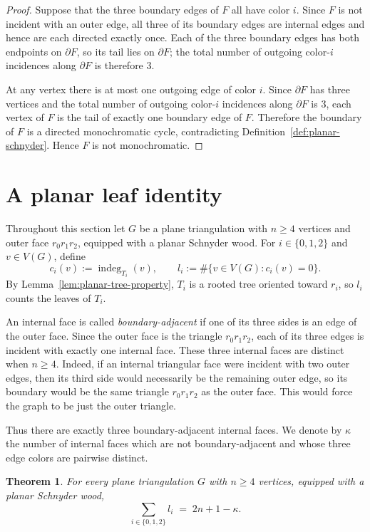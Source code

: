 \documentclass[11pt]{amsart}
\newcommand{\Zthree}{\{0,1,2\}}
\newcommand{\indeg}{\operatorname{indeg}}
\theoremstyle{plain}
\newtheorem{theorem}{Theorem}
\theoremstyle{definition}
\theoremstyle{remark}
\begin{document}
\begin{proof}
Suppose that the three boundary edges of $F$ all have color $i$. Since $F$ is not incident with an outer edge, all three of its boundary edges are internal edges and hence are each directed exactly once. Each of the three boundary edges has both endpoints on $\partial F$, so its tail lies on $\partial F$; the total number of outgoing color-$i$ incidences along $\partial F$ is therefore $3$.

At any vertex there is at most one outgoing edge of color $i$. Since $\partial F$ has three vertices and the total number of outgoing color-$i$ incidences along $\partial F$ is $3$, each vertex of $F$ is the tail of exactly one boundary edge of $F$. Therefore the boundary of $F$ is a directed monochromatic cycle, contradicting Definition~\ref{def:planar-schnyder}. Hence $F$ is not monochromatic.
\end{proof}


\section{A planar leaf identity}
\label{sec:planar-id}

Throughout this section let $G$ be a plane triangulation with $n \ge 4$ vertices and outer face $r_0 r_1 r_2$, equipped with a planar Schnyder wood. For $i \in \Zthree$ and $v \in V(G)$, define
\[
  c_i(v) := \indeg_{T_i}(v),
  \qquad
  l_i := \#\{v \in V(G) : c_i(v) = 0\}.
\]
By Lemma~\ref{lem:planar-tree-property}, $T_i$ is a rooted tree oriented toward $r_i$, so $l_i$ counts the leaves of $T_i$.

An internal face is called \emph{boundary-adjacent} if one of its three sides is an edge of the outer face. Since the outer face is the triangle $r_0 r_1 r_2$, each of its three edges is incident with exactly one internal face. These three internal faces are distinct when $n \ge 4$. Indeed, if an internal triangular face were incident with two outer edges, then its third side would necessarily be the remaining outer edge, so its boundary would be the same triangle $r_0 r_1 r_2$ as the outer face. This would force the graph to be just the outer triangle.

Thus there are exactly three boundary-adjacent internal faces. We denote by $\kappa$ the number of internal faces which are not boundary-adjacent and whose three edge colors are pairwise distinct.

\begin{theorem}
\label{thm:planar-leaf-identity}
For every plane triangulation $G$ with $n \ge 4$ vertices, equipped with a planar Schnyder wood,
\[
  \sum_{i \in \Zthree} l_i \;=\; 2n + 1 - \kappa.
\]
\end{theorem}
\end{document}
